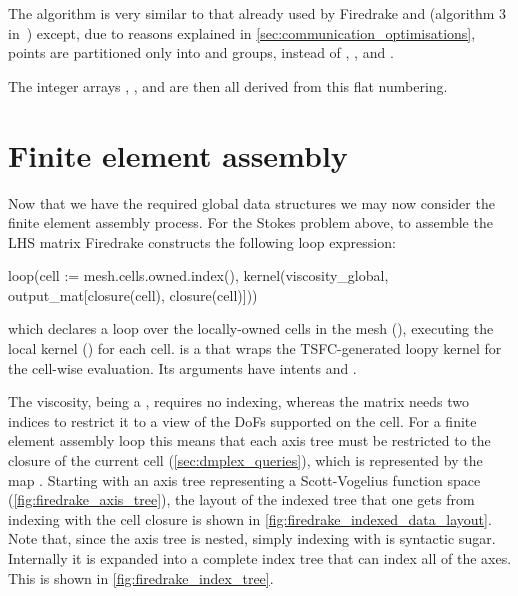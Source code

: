 \documentclass[thesis]{subfiles}
\begin{document}
The algorithm is very similar to that already used by Firedrake and  (algorithm 3 in~\cite{langeEfficientMeshManagement2016}) except, due to reasons explained in \cref{sec:communication_optimisations}, points are partitioned only into \ownediter{} and \ghostiter{} groups, instead of \coreiter{}, \ownediter{}, and \ghostiter{}.

The integer arrays , , and  are then all derived from this flat numbering.

\section{Finite element assembly}
\label{sec:firedrake_assembly}

Now that we have the required global data structures we may now consider the finite element assembly process.
For the Stokes problem above, to assemble the LHS matrix Firedrake constructs the following  loop expression:
\begin{pyinline}
  loop(cell := mesh.cells.owned.index(),
       kernel(viscosity_global,
              output_mat[closure(cell), closure(cell)]))
\end{pyinline}
which declares a loop over the locally-owned cells in the mesh (), executing the local kernel () for each cell.
 is a   that wraps the TSFC-generated loopy kernel for the cell-wise evaluation.
Its arguments have intents  and .

The viscosity, being a , requires no indexing, whereas the matrix needs two indices to restrict it to a view of the DoFs supported on the cell.
For a finite element assembly loop this means that each axis tree must be restricted to the closure of the current cell (\cref{sec:dmplex_queries}), which is represented by the map .
Starting with an axis tree representing a Scott-Vogelius function space (\cref{fig:firedrake_axis_tree}), the layout of the indexed tree that one gets from indexing with the cell closure is shown in \cref{fig:firedrake_indexed_data_layout}.
Note that, since the axis tree is nested, simply indexing with  is syntactic sugar.
Internally it is expanded into a complete index tree that can index all of the axes.
This is shown in \cref{fig:firedrake_index_tree}.
\end{document}
